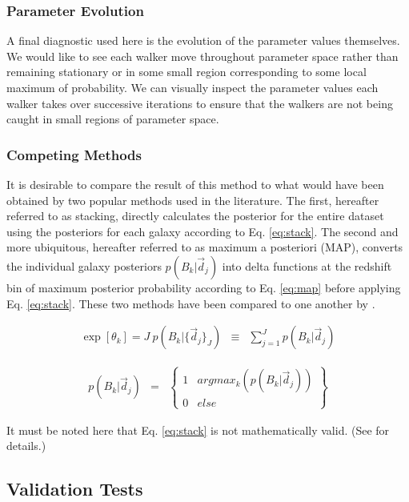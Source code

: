 \documentclass[preprint]{aastex}
\begin{document}
\subsubsection{Parameter Evolution}
\label{sec:params}

A final diagnostic used here is the evolution of the parameter values themselves.  We would like to see each walker move throughout parameter space rather than remaining stationary or in some small region corresponding to some local maximum of probability.  We can visually inspect the parameter values each walker takes over successive iterations to ensure that the walkers are not being caught in small regions of parameter space.

\subsubsection{Competing Methods}
\label{sec:sheldon}

It is desirable to compare the result of this method to what would have been obtained by two popular methods used in the literature.   The first, hereafter referred to as stacking, directly calculates the posterior for the entire dataset using the posteriors for each galaxy according to Eq. \ref{eq:stack}.  \citep{lim08}  The second and more ubiquitous, hereafter referred to as maximum a posteriori (MAP), converts the individual galaxy posteriors $p(B_{k}|\vec{d}_{j})$ into delta functions at the redshift bin of maximum posterior probability according to Eq. \ref{eq:map} before applying Eq. \ref{eq:stack}.  These two methods have been compared to one another by \citet{hil11, ben12}.

\begin{eqnarray}
\label{eq:stack}
\exp[\theta_{k}] = J\ p(B_{k}|\{\vec{d}_{j}\}_{J}) &\equiv& \sum_{j=1}^{J}p(B_{k}|\vec{d}_{j})
\end{eqnarray}

\begin{eqnarray}
\label{eq:map}
p(B_{k}|\vec{d}_{j}) &=& \left\{\begin{array}{cc}1&argmax_{k}(p(B_{k}|\vec{d}_{j}))\\0&else\end{array}\right\}
\end{eqnarray}

It must be noted here that Eq. \ref{eq:stack} is not mathematically valid.  (See \citet{hog12} for details.)

\subsection{Validation Tests}
\label{sec:valid}
\end{document}
